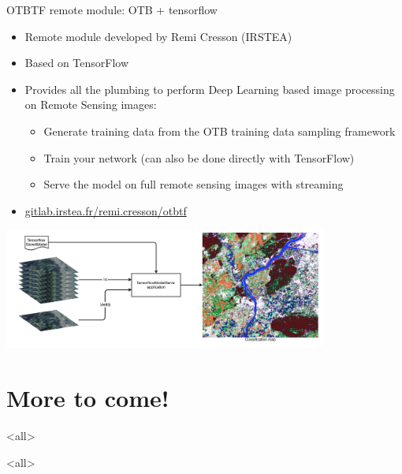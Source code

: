 \documentclass[8pt]{beamer}
\begin{document}
\begin{frame}{OTBTF remote module: OTB + tensorflow}
  \begin{itemize}
  \item Remote  module developed by Remi Cresson (IRSTEA)
  \item Based on TensorFlow
  \item Provides all the plumbing to perform Deep Learning based image processing on Remote Sensing images:
    \begin{itemize}
      \item Generate training data from the OTB training data sampling framework
      \item Train your network (can also be done directly with TensorFlow)
      \item Serve the model on full remote sensing images with streaming
    \end{itemize}
    \item \url{gitlab.irstea.fr/remi.cresson/otbtf}
  \end{itemize}
\begin{center}
  \includegraphics[width=0.8\textwidth]{images/classif_map.png}
\end{center}
\end{frame}

\section{More to come!}
\mode<all>


\mode<all>

\end{document}
